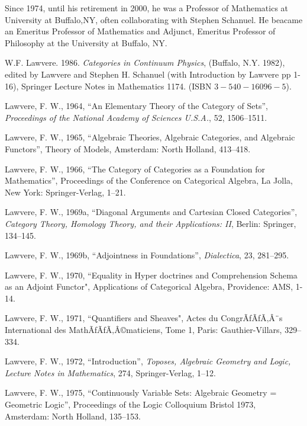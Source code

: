 \documentclass[12pt]{article}
\theoremstyle{plain}
\theoremstyle{definition}
\numberwithin{equation}{section}
\begin{document}
 Since 1974, until his retirement in 2000, he was a Professor of Mathematics at University at Buffalo,NY,  often collaborating with Stephen Schanuel. He beacame an Emeritus Professor of Mathematics and Adjunct, Emeritus Professor  of Philosophy at the University at Buffalo, NY.


\begin{thebibliography}{99}

W.F. Lawvere. 1986. {\em Categories in Continuum Physics}, (Buffalo, N.Y. 1982), edited by Lawvere and Stephen H. Schanuel (with Introduction by Lawvere pp 1-16), Springer Lecture Notes in Mathematics 1174. (ISBN $3-540-16096-5$).

Lawvere, F. W., 1964, ``An Elementary Theory of the Category of Sets'', {\em Proceedings of the National Academy of Sciences U.S.A.}, 52, 1506--1511. 

Lawvere, F. W., 1965, ``Algebraic Theories, Algebraic Categories, and Algebraic Functors'', Theory of Models, Amsterdam: North Holland, 413--418.  

Lawvere, F. W., 1966, ``The Category of Categories as a Foundation for Mathematics'', Proceedings of the Conference on Categorical Algebra, La Jolla, New York: Springer-Verlag, 1--21. 

Lawvere, F. W., 1969a, ``Diagonal Arguments and Cartesian Closed Categories'', {\em Category Theory, Homology Theory, and their Applications: II}, Berlin: Springer, 134--145.  

Lawvere, F. W., 1969b, ``Adjointness in Foundations'', {\em Dialectica}, 23, 281--295.  

Lawvere, F. W., 1970, ``Equality in Hyper doctrines and Comprehension Schema as an Adjoint Functor", Applications of Categorical Algebra, Providence: AMS, 1-14.  

Lawvere, F. W., 1971, ``Quantifiers and Sheaves", Actes du CongrÃƒÃƒÃ‚Â¨s International des MathÃƒÃƒÃ‚Â©maticiens, Tome 1, Paris: Gauthier-Villars, 329--334. 

Lawvere, F. W., 1972, ``Introduction'', {\em Toposes, Algebraic Geometry and Logic, Lecture Notes in Mathematics}, 274, Springer-Verlag, 1--12.  

Lawvere, F. W., 1975, ``Continuously Variable Sets: Algebraic Geometry = Geometric Logic'', Proceedings of the Logic Colloquium Bristol 1973, Amsterdam: North Holland, 135--153. 


\end{thebibliography}
\end{document}
